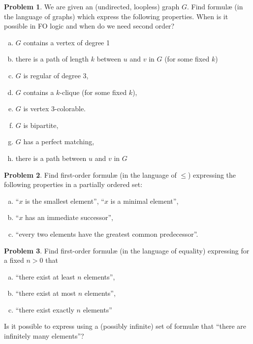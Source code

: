 \documentclass{amsart}
\theoremstyle{definition}
\newtheorem{problem}{Problem}
\begin{document}
\smallskip
\begin{problem}
We are given an (undirected, loopless) graph $G$. Find formul{\ae} (in the language of graphs) which express the following properties. When is it possible in FO logic and when do we need second order?
\begin{enumerate}[(a)]
    \item $G$ contains a vertex of degree 1
    \item there is a path of length $k$ between $u$ and $v$ in $G$ (for some fixed $k$)
    \item $G$ is regular of degree 3,
    \item $G$ contains a $k$-clique (for some fixed $k$),
    \item $G$ is vertex 3-colorable.
    \item $G$ is bipartite,
    \item $G$ has a perfect matching,
    \item there is a path between $u$ and $v$ in $G$
\end{enumerate}
\end{problem}


\smallskip
\begin{problem} Find first-order formul{\ae} (in the language of $\le$) expressing the following properties in a partially ordered set:
\begin{enumerate}[(a)]
\item ``$x$ is the smallest element'', ``$x$ is a minimal element'',
\item ``$x$ has an immediate successor'',
\item ``every two elements have the greatest common predecessor''.
\end{enumerate}
\end{problem}

\smallskip
\begin{problem} Find first-order formul{\ae} (in the language of equality) expressing for a fixed $n>0$ that
\begin{enumerate}[(a)]
\item ``there exist at least $n$ elements'',
\item ``there exist at most $n$ elements'',
\item ``there exist exactly  $n$ elements''
\end{enumerate}
Is it possible to express using a (possibly infinite) set of formul{\ae} that  ``there are infinitely many elements''?
\end{problem}
\end{document}
